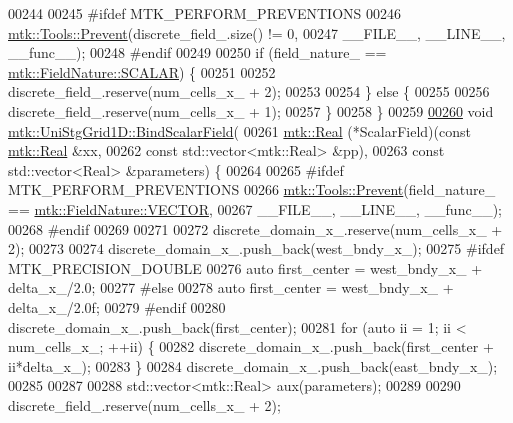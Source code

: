 \begin{DoxyCode}
00244 
00245 \textcolor{preprocessor}{  #ifdef MTK\_PERFORM\_PREVENTIONS}
00246   \hyperlink{classmtk_1_1Tools_a332324c6f25e66be9dff48c5987a3b9f}{mtk::Tools::Prevent}(discrete\_field\_.size() != 0,
00247                       \_\_FILE\_\_, \_\_LINE\_\_, \_\_func\_\_);
00248 \textcolor{preprocessor}{  #endif}
00249 
00250   \textcolor{keywordflow}{if} (field\_nature\_ == \hyperlink{namespacemtk_ga4c54f2a329cfb4e56213b02a259d19e2a8f3d9a4b6a7b7f2c7afa61ca113d0db9}{mtk::FieldNature::SCALAR}) \{
00251 
00252     discrete\_field\_.reserve(num\_cells\_x\_ + 2);
00253 
00254   \} \textcolor{keywordflow}{else} \{
00255 
00256     discrete\_field\_.reserve(num\_cells\_x\_ + 1);
00257   \}
00258 \}
00259 
\hypertarget{mtk__uni__stg__grid__1d_8cc_source_l00260}{}\hyperlink{classmtk_1_1UniStgGrid1D_a6ad3040de719dff71d934f0062e9860f}{00260} \textcolor{keywordtype}{void} \hyperlink{classmtk_1_1UniStgGrid1D_a6ad3040de719dff71d934f0062e9860f}{mtk::UniStgGrid1D::BindScalarField}(
00261     \hyperlink{group__c01-roots_gac080bbbf5cbb5502c9f00405f894857d}{mtk::Real} (*ScalarField)(\textcolor{keyword}{const} \hyperlink{group__c01-roots_gac080bbbf5cbb5502c9f00405f894857d}{mtk::Real} &xx,
00262                              \textcolor{keyword}{const} std::vector<mtk::Real> &pp),
00263     \textcolor{keyword}{const} std::vector<Real> &parameters) \{
00264 
00265 \textcolor{preprocessor}{  #ifdef MTK\_PERFORM\_PREVENTIONS}
00266   \hyperlink{classmtk_1_1Tools_a332324c6f25e66be9dff48c5987a3b9f}{mtk::Tools::Prevent}(field\_nature\_ == 
      \hyperlink{namespacemtk_ga4c54f2a329cfb4e56213b02a259d19e2a87752381b583740610f1dfeb07fdad7e}{mtk::FieldNature::VECTOR},
00267                       \_\_FILE\_\_, \_\_LINE\_\_, \_\_func\_\_);
00268 \textcolor{preprocessor}{  #endif}
00269 
00271 
00272   discrete\_domain\_x\_.reserve(num\_cells\_x\_ + 2);
00273 
00274   discrete\_domain\_x\_.push\_back(west\_bndy\_x\_);
00275 \textcolor{preprocessor}{  #ifdef MTK\_PRECISION\_DOUBLE}
00276   \textcolor{keyword}{auto} first\_center = west\_bndy\_x\_ + delta\_x\_/2.0;
00277 \textcolor{preprocessor}{  #else}
00278   \textcolor{keyword}{auto} first\_center = west\_bndy\_x\_ + delta\_x\_/2.0f;
00279 \textcolor{preprocessor}{  #endif}
00280   discrete\_domain\_x\_.push\_back(first\_center);
00281   \textcolor{keywordflow}{for} (\textcolor{keyword}{auto} ii = 1; ii < num\_cells\_x\_; ++ii) \{
00282     discrete\_domain\_x\_.push\_back(first\_center + ii*delta\_x\_);
00283   \}
00284   discrete\_domain\_x\_.push\_back(east\_bndy\_x\_);
00285 
00287 
00288   std::vector<mtk::Real> aux(parameters);
00289 
00290   discrete\_field\_.reserve(num\_cells\_x\_ + 2);

\end{DoxyCode}
